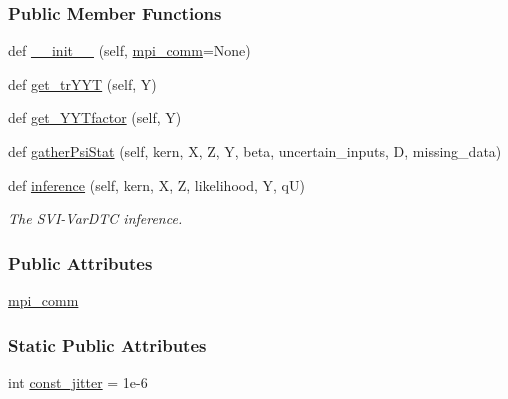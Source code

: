 \subsubsection*{Public Member Functions}
\begin{DoxyCompactItemize}
\item 
def \hyperlink{group__icubclient__SAM__Core_af7f579c5de7488136d1a6b164b5b7aa8}{\+\_\+\+\_\+init\+\_\+\+\_\+} (self, \hyperlink{group__icubclient__SAM__Core_ac3cf9db01577d16c662da835de33216d}{mpi\+\_\+comm}=None)
\item 
def \hyperlink{group__icubclient__SAM__Core_a1ce9e3e49b288849a410308763ed04b5}{get\+\_\+tr\+Y\+YT} (self, Y)
\item 
def \hyperlink{group__icubclient__SAM__Core_a41e0fce26799dae2a4888f06eef17b4c}{get\+\_\+\+Y\+Y\+Tfactor} (self, Y)
\item 
def \hyperlink{group__icubclient__SAM__Core_aaf3a89b93b73c036fed79df4d39cee04}{gather\+Psi\+Stat} (self, kern, X, Z, Y, beta, uncertain\+\_\+inputs, D, missing\+\_\+data)
\item 
def \hyperlink{group__icubclient__SAM__Core_a2980852b64630be0fd8e2337c730c428}{inference} (self, kern, X, Z, likelihood, Y, qU)
\begin{DoxyCompactList}\small\item\em The S\+V\+I-\/\+Var\+D\+TC inference. \end{DoxyCompactList}\end{DoxyCompactItemize}
\subsubsection*{Public Attributes}
\begin{DoxyCompactItemize}
\item 
\hyperlink{group__icubclient__SAM__Core_ac3cf9db01577d16c662da835de33216d}{mpi\+\_\+comm}
\end{DoxyCompactItemize}
\subsubsection*{Static Public Attributes}
\begin{DoxyCompactItemize}
\item 
int \hyperlink{group__icubclient__SAM__Core_a5dc542b16c16c2b6bbfd6e44c76d2533}{const\+\_\+jitter} = 1e-\/6
\end{DoxyCompactItemize}


